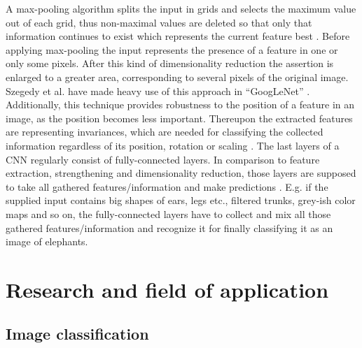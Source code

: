 \documentclass[12pt,twoside]{article}
\theoremstyle{plain}
\theoremstyle{definition}
\theoremstyle{remark}
\begin{document}
A max-pooling algorithm splits the input in grids and selects the maximum value out of each grid, thus non-maximal values are deleted so that only that information continues to exist which represents the current feature best \cite{GoogLeNet, ImangeNetClassificationCNN-Krizhevsky}.
Before applying max-pooling the input represents the presence of a feature in one or only some pixels. After this kind of dimensionality reduction the assertion is enlarged to a greater area, corresponding to several pixels of the original image. Szegedy et al. have made heavy use of this approach in \enquote{GoogLeNet} \cite{GoogLeNet}.
Additionally, this technique provides robustness to the position of a feature in an image, as the position becomes less important. Thereupon the extracted features are representing invariances, which are needed for classifying the collected information regardless of its position, rotation or scaling \cite{Invariances-Neural-Network-Khotanzad}.
The last layers of a CNN regularly consist of fully-connected layers. In comparison to feature extraction, strengthening and dimensionality reduction, those layers are supposed to take all gathered features/information and make predictions \cite{DeepNeuralNetworksObjectDetection-Szegedy, Multi-column-dnn-for-traffic-signs-ciresan, MultiColumnDeepNeuralNetworksClassification-Ciresan}. E.g. if the supplied input contains big shapes of ears, legs etc., filtered trunks, grey-ish color maps and so on, the fully-connected layers have to collect and mix all those gathered features/information and recognize it for finally classifying it as an image of elephants.



\section{Research and field of application}
\label{sec:research_and_application}


\subsection{Image classification}
\end{document}
